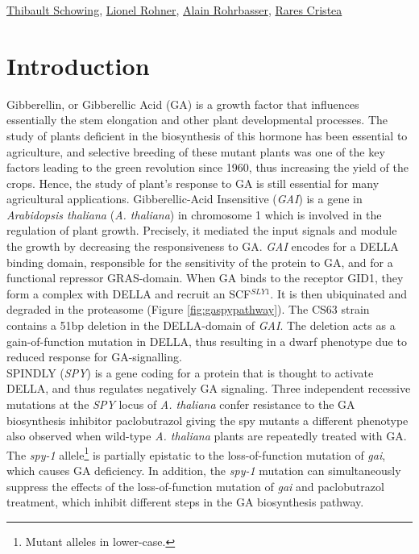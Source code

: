 \documentclass[10pt,a4paper]{article}
\begin{document}
\href{mailto:thibault.schowing@unifr.ch}{Thibault Schowing}, \href{mailto:lio_roh@students.unibe.ch}{Lionel Rohner},
\href{mailto:alain.rohrbasser.unifr.ch}{Alain Rohrbasser},
\href{mailto:rares.cristea@unifr.ch}{Rares Cristea}\\

\section*{\large Introduction}
Gibberellin, or Gibberellic Acid (GA) is a growth factor that influences essentially the stem elongation and other plant developmental processes\cite{hooley_gibberellins:_nodate}. The study of plants deficient in the biosynthesis of this hormone has been essential to agriculture, and selective breeding of these mutant plants  was one of the key factors leading to the green revolution since 1960, thus increasing the yield of the crops. Hence, the study of plant’s response to GA is still essential for many agricultural applications\cite{ordonio_new_2017}. Gibberellic-Acid Insensitive (\textit{GAI}) is a gene in \textit{Arabidopsis thaliana} (\textit{A. thaliana}) in chromosome 1 which is involved in the regulation of plant growth. Precisely, it mediated the input signals and module the growth by decreasing the responsiveness to GA\cite{peng_arabidopsis_1997}.
\textit{GAI} encodes for a DELLA binding domain, responsible for the sensitivity of the protein to GA, and for a functional repressor GRAS-domain. When GA binds to the receptor GID1, they form a complex with DELLA and recruit an SCF$^{SLY1}$. It is then ubiquinated and degraded in the proteasome (Figure \ref{fig:gaspypathway})\cite{hauvermale_gibberellin_2012}. The CS63 strain contains a 51bp deletion in the DELLA-domain of \textit{GAI}. The deletion acts as a gain-of-function mutation in DELLA, thus resulting in a dwarf phenotype due to reduced response for GA-signalling\cite{peng_arabidopsis_1997,lee_gibberellin_2002}.\\


\noindent SPINDLY (\textit{SPY}) is a gene coding for a protein that is thought to activate DELLA, and thus regulates negatively GA signaling\cite{zentella_arabidopsis_2017}. Three independent recessive mutations at the \textit{SPY} locus of \textit{A. thaliana} confer resistance to the GA biosynthesis inhibitor paclobutrazol giving the spy mutants a different phenotype also observed when wild-type \textit{A. thaliana} plants are repeatedly treated with GA. The \textit{spy-1} allele\footnote{Mutant alleles in lower-case.} is partially epistatic to the loss-of-function mutation of \textit{gai}, which causes GA deficiency. In addition, the \textit{spy-1} mutation can simultaneously suppress the effects of the loss-of-function mutation of \textit{gai} and paclobutrazol treatment, which inhibit different steps in the GA biosynthesis pathway\cite{lee_gibberellin_2002, jacobsen_mutations_nodate}.\\
\end{document}
